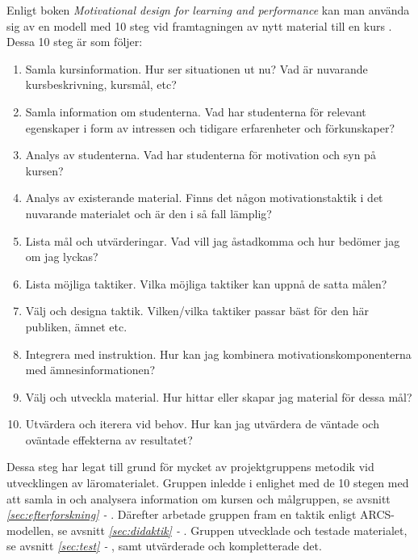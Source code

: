 \documentclass[12pt,a4paper,twoside,openright]{article}
\begin{document}
Enligt boken \textit{Motivational design for learning and performance}
kan man använda sig av en modell med 10 steg vid framtagningen av nytt
material till en kurs \cite{motivational_design}. Dessa 10 steg är som
följer:

\begin{enumerate}
\item Samla kursinformation. Hur ser situationen ut nu? Vad är
 nuvarande kursbeskrivning, kursmål, etc?

\item Samla information om studenterna. Vad har studenterna
 för relevant egenskaper i form av intressen och tidigare
 erfarenheter och förkunskaper?

\item Analys av studenterna. Vad har studenterna för motivation och
 syn på kursen?

\item Analys av existerande material. Finns det någon
 motivationstaktik i det nuvarande materialet och är den i så fall
 lämplig?

\item Lista mål och utvärderingar. Vad vill jag åstadkomma och hur
 bedömer jag om jag lyckas?

\item Lista möjliga taktiker. Vilka möjliga taktiker kan uppnå de
 satta målen?

\item Välj och designa taktik. Vilken/vilka taktiker passar bäst för
 den här publiken, ämnet etc.

\item Integrera med instruktion. Hur kan jag kombinera
 motivationskomponenterna med ämnesinformationen?

\item Välj och utveckla material. Hur hittar eller skapar jag material
 för dessa mål?

\item Utvärdera och iterera vid behov. Hur kan jag utvärdera de
 väntade och oväntade effekterna av resultatet?

\end{enumerate}

Dessa steg har legat till grund för mycket av projektgruppens metodik
vid utvecklingen av läromaterialet. Gruppen inledde i enlighet med de
10 stegen med att samla in och analysera information om kursen och
målgruppen, se avsnitt \textit{\ref{sec:efterforskning} -
  }. Därefter arbetade gruppen fram en
taktik enligt ARCS-modellen, se avsnitt \textit{\ref{sec:didaktik} -
  }. Gruppen utvecklade och testade materialet,
se avsnitt \textit{\ref{sec:test} - }, samt
utvärderade och kompletterade det.
\end{document}
